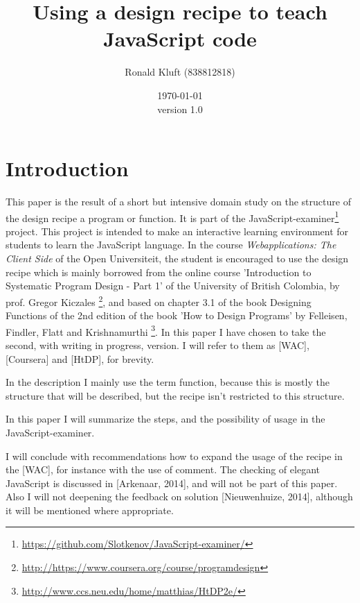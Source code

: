 \documentclass{article}
\begin{document}
 

\title{Using a design recipe to teach JavaScript code}
\author{Ronald Kluft (838812818)} 
\date{\today \\version 1.0} \maketitle 





\section{Introduction}

This paper is the result of a short but intensive domain study on the  structure
of the design recipe a program or function.
It is part of the JavaScript-examiner\footnote{\url{https://github.com/Slotkenov/JavaScript-examiner/}} project.
This project is intended to make an interactive learning environment for students
to learn the JavaScript language. 
In the course {\em Webapplications: The Client Side} of the Open Universiteit,
the student is encouraged to use the design recipe which is mainly borrowed from
the online course 'Introduction to Systematic Program Design - Part 1'
of the University of British Colombia, by prof. Gregor Kiczales
\footnote{\url{http://https://www.coursera.org/course/programdesign}},
and based on chapter 3.1 of the book Designing Functions of the 2nd edition of the book
'How to Design Programs' by Felleisen, Findler, Flatt and Krishnamurthi
\footnote{\url{http://www.ccs.neu.edu/home/matthias/HtDP2e/}}.
In this paper I have chosen to take the second, with writing in progress, version.
I will refer to them as [WAC], [Coursera] and [HtDP], for brevity.

In the description I mainly use the term function, because this is mostly
the structure that will be described, but the recipe isn't restricted to this
structure.

In this paper I will summarize the steps, and the possibility of usage in the 
JavaScript-examiner.

I will conclude with recommendations how to expand the usage of the recipe in
the [WAC], for instance with the use of comment.
The checking of elegant JavaScript is discussed in [Arkenaar, 2014], and will
not be part of this paper.
Also I will not deepening the feedback on solution [Nieuwenhuize, 2014], although
it will be mentioned where appropriate.
\end{document}
